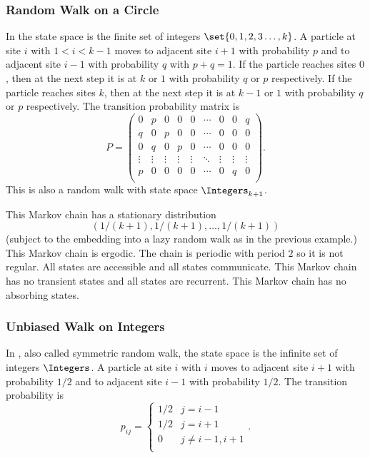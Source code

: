 \documentclass[12pt]{article}
\begin{document}
\subsubsection*{Random Walk on a Circle}

In  the state space is the finite set of
integers \( \set{0, 1, 2, 3 \dots, k} \).  A particle at%
site \( i \) with \( 1 < i < k-1 \) moves to adjacent site \( i+1 \)
with probability \( p \) and to adjacent site \( i-1 \) with probability
\( q \) with \( p+q = 1 \).  If the particle reaches sites \( 0 \), then
at the next step it is at \( k \) or \( 1 \) with probability \( q \) or
\( p \) respectively.  If the particle reaches sites \( k \), then at
the next step it is at \( k-1 \) or \( 1 \) with probability \( q \) or \(
p \) respectively.  The transition probability matrix is
\[
    P =
    \begin{pmatrix}
        0 & p & 0 & 0 & 0 & \cdots & 0 & 0 & q \\
        q & 0 & p & 0 & 0 & \cdots & 0 & 0 & 0 \\
        0 & q & 0 & p & 0 & \cdots & 0 & 0 & 0 \\
        \vdots & \vdots & \vdots & \vdots & \vdots & \ddots & \vdots &
        \vdots & \vdots \\
        p & 0 & 0 & 0 & 0 & \cdots & 0 & q & 0 \\
    \end{pmatrix}
    .
\] This is also a random walk with state space \( \Integers_{k+1} \).

This Markov chain has a stationary distribution
\[
    (1/(k+1), 1/(k+1),\dots, 1/(k+1))
\] (subject to the embedding into a lazy random walk as in the previous
example.) This Markov chain is ergodic.  The chain is periodic with
period \( 2 \) so it is not regular.  All states are accessible and all
states communicate.  This Markov chain has no transient states and all
states are recurrent.  This Markov chain has no absorbing states.

\subsubsection*{Unbiased Walk on Integers}

In , also called symmetric%
random walk, the state space is the infinite set of integers \(
\Integers \).  A particle at site \( i \) with \( i \) moves to adjacent
site \( i+1 \) with probability \( 1/2 \) and to adjacent site \( i-1 \)
with probability \( 1/2 \).  The transition probability is
\[
    p_{ij} =
    \begin{cases}
        1/2 & j = i-1 \\
        1/2 & j = i+1 \\
        0 & j \ne i-1, i+1 \\
    \end{cases}
    .
\]
\end{document}
